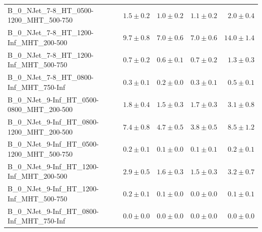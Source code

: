 \documentclass{beamer}
\begin{document}
\begin{frame}
\begin{tabular}{lrrrr}
     B\_0\_NJet\_7-8\_HT\_0500-1200\_MHT\_500-750 &               $1.5\pm0.2$&               $1.0\pm0.2$&               $1.1\pm0.2$&                   $2.0\pm0.4$ \\
      B\_0\_NJet\_7-8\_HT\_1200-Inf\_MHT\_200-500 &               $9.7\pm0.8$&               $7.0\pm0.6$&               $7.0\pm0.6$&                  $14.0\pm1.4$ \\
      B\_0\_NJet\_7-8\_HT\_1200-Inf\_MHT\_500-750 &               $0.7\pm0.2$&               $0.6\pm0.1$&               $0.7\pm0.2$&                   $1.3\pm0.3$ \\
      B\_0\_NJet\_7-8\_HT\_0800-Inf\_MHT\_750-Inf &               $0.3\pm0.1$&               $0.2\pm0.0$&               $0.3\pm0.1$&                   $0.5\pm0.1$ \\
   B\_0\_NJet\_9-Inf\_HT\_0500-0800\_MHT\_200-500 &               $1.8\pm0.4$&               $1.5\pm0.3$&               $1.7\pm0.3$&                   $3.1\pm0.8$ \\
   B\_0\_NJet\_9-Inf\_HT\_0800-1200\_MHT\_200-500 &               $7.4\pm0.8$&               $4.7\pm0.5$&               $3.8\pm0.5$&                   $8.5\pm1.2$ \\
   B\_0\_NJet\_9-Inf\_HT\_0500-1200\_MHT\_500-750 &               $0.2\pm0.1$&               $0.1\pm0.0$&               $0.1\pm0.1$&                   $0.2\pm0.1$ \\
    B\_0\_NJet\_9-Inf\_HT\_1200-Inf\_MHT\_200-500 &               $2.9\pm0.5$&               $1.6\pm0.3$&               $1.5\pm0.3$&                   $3.2\pm0.7$ \\
    B\_0\_NJet\_9-Inf\_HT\_1200-Inf\_MHT\_500-750 &               $0.2\pm0.1$&               $0.1\pm0.0$&               $0.0\pm0.0$&                   $0.1\pm0.1$ \\
    B\_0\_NJet\_9-Inf\_HT\_0800-Inf\_MHT\_750-Inf &               $0.0\pm0.0$&               $0.0\pm0.0$&               $0.0\pm0.0$&                   $0.0\pm0.0$ \\

\bottomrule
\end{tabular}
\end{frame}
\end{document}
